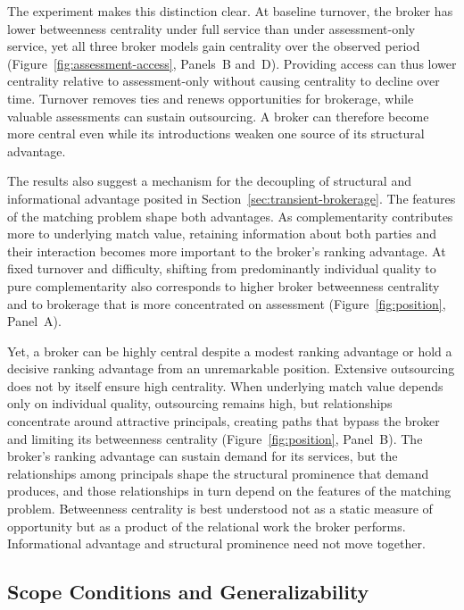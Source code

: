 \documentclass[
]{article}
\begin{document}
The experiment makes this distinction clear. At baseline turnover, the broker has lower betweenness centrality under full service than under assessment-only service, yet all three broker models gain centrality over the observed period (Figure~\ref{fig:assessment-access}, Panels~B and~D). Providing access can thus lower centrality relative to assessment-only without causing centrality to decline over time. Turnover removes ties and renews opportunities for brokerage, while valuable assessments can sustain outsourcing. A broker can therefore become more central even while its introductions weaken one source of its structural advantage.

The results also suggest a mechanism for the decoupling of structural and informational advantage posited in Section~\ref{sec:transient-brokerage}. The features of the matching problem shape both advantages. As complementarity contributes more to underlying match value, retaining information about both parties and their interaction becomes more important to the broker’s ranking advantage. At fixed turnover and difficulty, shifting from predominantly individual quality to pure complementarity also corresponds to higher broker betweenness centrality and to brokerage that is more concentrated on assessment (Figure~\ref{fig:position}, Panel~A).

Yet, a broker can be highly central despite a modest ranking advantage or hold a decisive ranking advantage from an unremarkable position. Extensive outsourcing does not by itself ensure high centrality. When underlying match value depends only on individual quality, outsourcing remains high, but relationships concentrate around attractive principals, creating paths that bypass the broker and limiting its betweenness centrality (Figure~\ref{fig:position}, Panel~B). The broker’s ranking advantage can sustain demand for its services, but the relationships among principals shape the structural prominence that demand produces, and those relationships in turn depend on the features of the matching problem. Betweenness centrality is best understood not as a static measure of opportunity but as a product of the relational work the broker performs. Informational advantage and structural prominence need not move together.

\subsection{Scope Conditions and Generalizability}
\end{document}
